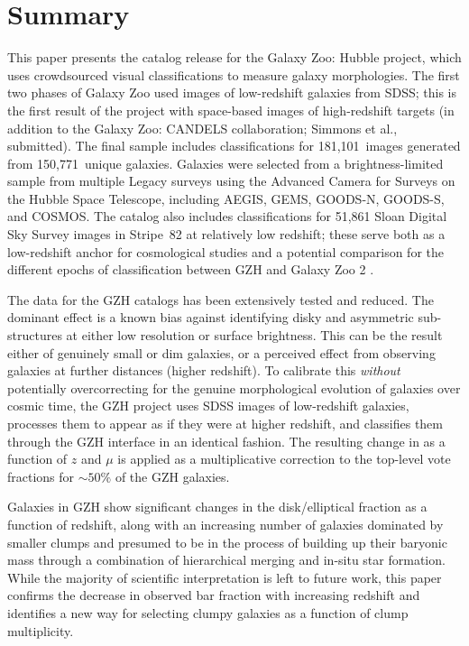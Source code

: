 \documentclass[twocolumn]{aastex6}
\begin{document}
\section{Summary}\label{sec:summary}


This paper presents the catalog release for the Galaxy Zoo: Hubble project, which uses crowdsourced visual classifications to measure galaxy morphologies. The first two phases of Galaxy Zoo \citep{lin11,wil13} used images of low-redshift galaxies from SDSS; this is the first result of the project with space-based images of high-redshift targets (in addition to the Galaxy Zoo: CANDELS collaboration; Simmons et al., submitted). The final sample includes classifications for 181,101~images generated from 150,771~unique galaxies. Galaxies were selected from a brightness-limited sample from multiple Legacy surveys using the Advanced Camera for Surveys on the Hubble Space Telescope, including AEGIS, GEMS, GOODS-N, GOODS-S, and COSMOS. The catalog also includes classifications for 51,861 Sloan Digital Sky Survey images in Stripe~82 at relatively low redshift; these serve both as a low-redshift anchor for cosmological studies and a potential comparison for the different epochs of classification between GZH and Galaxy Zoo 2 \citep{wil13}. 

The data for the GZH catalogs has been extensively tested and reduced. The dominant effect is a known bias against identifying disky and asymmetric sub-structures at either low resolution or surface brightness. This can be the result either of genuinely small or dim galaxies, or a perceived effect from observing galaxies at further distances (higher redshift). To calibrate this \emph{without} potentially overcorrecting for the genuine morphological evolution of galaxies over cosmic time, the GZH project uses SDSS images of low-redshift galaxies, processes them to appear as if they were at higher redshift, and classifies them through the GZH interface in an identical fashion. The resulting change in \ffeatures{} as a function of $z$ and $\mu$ is applied as a multiplicative correction to the top-level vote fractions for $\sim50\%$ of the GZH galaxies. 

Galaxies in GZH show significant changes in the disk/elliptical fraction as a function of redshift, along with an increasing number of galaxies dominated by smaller clumps and presumed to be in the process of building up their baryonic mass through a combination of hierarchical merging and in-situ star formation. While the majority of scientific interpretation is left to future work, this paper confirms the decrease in observed bar fraction with increasing redshift \citep{mel14} and identifies a new way for selecting clumpy galaxies as a function of clump multiplicity.
\end{document}

